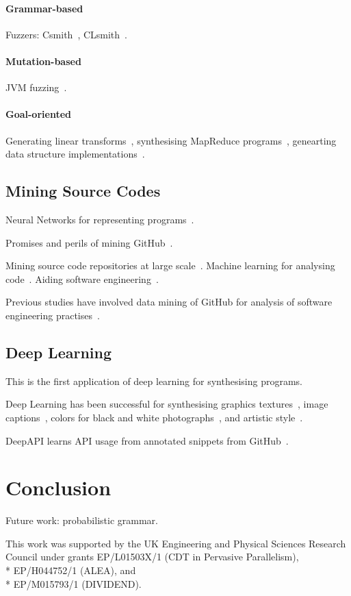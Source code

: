 \documentclass[preprint,nonatbib,10pt,nocopyrightspace]{sigplanconf}
\begin{document}
\paragraph{Grammar-based} Fuzzers:
Csmith~\cite{Yang2012}, CLsmith~\cite{Pflanzer2016}.


\paragraph{Mutation-based} JVM fuzzing~\cite{Chena}.


\paragraph{Goal-oriented} Generating linear
transforms~\cite{Voronenko2009}, synthesising MapReduce
programs~\cite{Smith}, genearting data structure
implementations~\cite{Loncaric2016}.


\subsection{Mining Source Codes}

Neural Networks for representing programs~\cite{Bunel}.

Promises and perils of mining GitHub~\cite{Bird2009}.

Mining source code repositories at large
scale~\cite{Allamanis2013a,White2015a}. Machine learning for analysing
code~\cite{Allamanis2014a,Raychev}. Aiding software
engineering~\cite{Allamanis2014,Bird2015}.

Previous studies have involved data mining of GitHub for analysis of
software engineering
practises~\cite{Wu2014,Guzman2014,Baishakhi2014a,Vasilescu2015}.


\subsection{Deep Learning}

This is the first application of deep learning for synthesising
programs.

Deep Learning has been successful for synthesising graphics
textures~\cite{Gatys2015a}, image captions~\cite{Vinyals}, colors for
black and white photographs~\cite{Zhang2016}, and artistic
style~\cite{Gatys2015}.

DeepAPI learns API usage from annotated snippets from
GitHub~\cite{Zhang2015a}.


\section{Conclusion}\label{sec:conclusion}

Future work: probabilistic grammar.


\acks

This work was supported by the UK Engineering and Physical Sciences
Research Council under grants EP/L01503X/1 (CDT in Pervasive
Parallelism),\\* EP/H044752/1 (ALEA), and\\* EP/M015793/1 (DIVIDEND).


\label{bibliography}
\printbibliography
\end{document}
